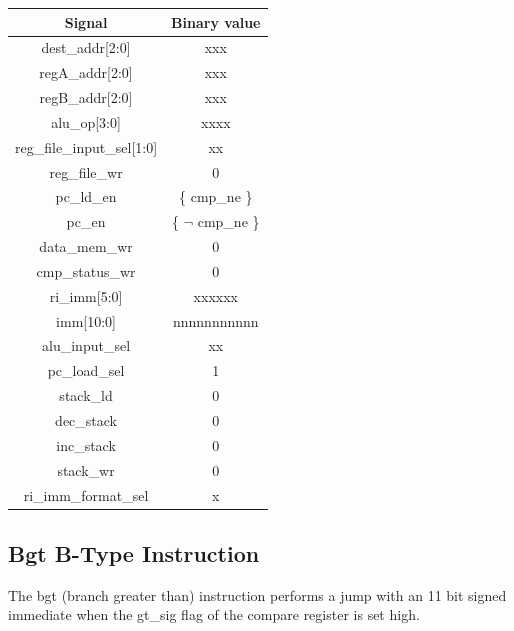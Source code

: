 \documentclass{article}
\begin{document}
\begin{par}
	\begin{center}
		\begin{tabular}{|c|c|}
			\hline 
			\textbf{Signal} & \textbf{Binary value} \\ 
			\hline 
			dest\_addr[2:0] & xxx \\ 
			\hline 
			regA\_addr[2:0] & xxx \\ 
			\hline 
			regB\_addr[2:0] & xxx \\ 
			\hline 
			alu\_op[3:0] & xxxx \\ 
			\hline 
			reg\_file\_input\_sel[1:0] & xx \\ 
			\hline 
			reg\_file\_wr & 0 \\ 
			\hline 
			pc\_ld\_en & \{ cmp\_ne \} \\ 
			\hline 
			pc\_en & \{ $ \lnot $ cmp\_ne \} \\ 
			\hline 
			data\_mem\_wr & 0 \\ 
			\hline 
			cmp\_status\_wr & 0 \\ 
			\hline 
			ri\_imm[5:0] & xxxxxx \\ 
			\hline 
			imm[10:0] & nnnnnnnnnnn \\ 
			\hline 
			alu\_input\_sel & xx \\ 
			\hline 
			pc\_load\_sel & 1 \\ 
			\hline 
			stack\_ld & 0 \\ 
			\hline 
			dec\_stack & 0 \\ 
			\hline 
			inc\_stack & 0 \\ 
			\hline 
			stack\_wr & 0 \\ 
			\hline 
			ri\_imm\_format\_sel & x \\ 
			\hline 
		\end{tabular} 
	\end{center}

	\newpage
	\subsection{Bgt B-Type Instruction}
	
	The bgt (branch greater than) instruction performs a jump with an 11 bit signed immediate when the gt\_sig flag of the compare register is set high. 
	

\end{par}
\end{document}
